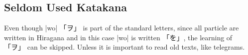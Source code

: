 \subsection{Seldom Used Katakana}\label{subsec:SeldomlyUsedKatakana}


Even though |wo| {「ヲ」} is part of the standard letters, since all
particle are written in Hiragana and in this case |wo| is written {「を」}, the
learning of {「ヲ」} can be skipped. Unless it is important to read old texts,
like telegrams.


